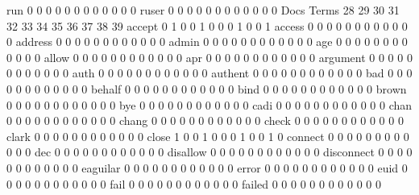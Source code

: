 \documentclass[compress,8pt]{beamer}
\begin{document}
\begin{frame}
\begin{Schunk}
  run                                       0  0  0  0  0  0  0  0  0  0  0  0
  ruser                                     0  0  0  0  0  0  0  0  0  0  0  0
                                          Docs
Terms                                      28 29 30 31 32 33 34 35 36 37 38 39
  accept                                    0  1  0  0  1  0  0  0  1  0  0  1
  access                                    0  0  0  0  0  0  0  0  0  0  0  0
  address                                   0  0  0  0  0  0  0  0  0  0  0  0
  admin                                     0  0  0  0  0  0  0  0  0  0  0  0
  age                                       0  0  0  0  0  0  0  0  0  0  0  0
  allow                                     0  0  0  0  0  0  0  0  0  0  0  0
  apr                                       0  0  0  0  0  0  0  0  0  0  0  0
  argument                                  0  0  0  0  0  0  0  0  0  0  0  0
  auth                                      0  0  0  0  0  0  0  0  0  0  0  0
  authent                                   0  0  0  0  0  0  0  0  0  0  0  0
  bad                                       0  0  0  0  0  0  0  0  0  0  0  0
  behalf                                    0  0  0  0  0  0  0  0  0  0  0  0
  bind                                      0  0  0  0  0  0  0  0  0  0  0  0
  brown                                     0  0  0  0  0  0  0  0  0  0  0  0
  bye                                       0  0  0  0  0  0  0  0  0  0  0  0
  cadi                                      0  0  0  0  0  0  0  0  0  0  0  0
  chan                                      0  0  0  0  0  0  0  0  0  0  0  0
  chang                                     0  0  0  0  0  0  0  0  0  0  0  0
  check                                     0  0  0  0  0  0  0  0  0  0  0  0
  clark                                     0  0  0  0  0  0  0  0  0  0  0  0
  close                                     1  0  0  1  0  0  0  1  0  0  1  0
  connect                                   0  0  0  0  0  0  0  0  0  0  0  0
  dec                                       0  0  0  0  0  0  0  0  0  0  0  0
  disallow                                  0  0  0  0  0  0  0  0  0  0  0  0
  disconnect                                0  0  0  0  0  0  0  0  0  0  0  0
  eaguilar                                  0  0  0  0  0  0  0  0  0  0  0  0
  error                                     0  0  0  0  0  0  0  0  0  0  0  0
  euid                                      0  0  0  0  0  0  0  0  0  0  0  0
  fail                                      0  0  0  0  0  0  0  0  0  0  0  0
  failed                                    0  0  0  0  0  0  0  0  0  0  0  0

\end{Schunk}
\end{frame}
\end{document}
